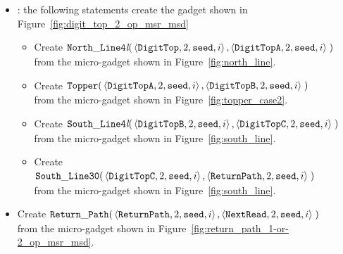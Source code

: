 \begin{itemize}
    \item {\dtop}: the following statements create the gadget shown in Figure~\ref{fig:digit_top_2_op_msr_msd}
        \begin{itemize}
            \item Create
            $\begin{aligned}[t]
                {\tt North\_Line4\textit{l}}(& \left\langle {\tt DigitTop},  2, {\tt seed}, i \right\rangle,
                                               \left\langle {\tt DigitTopA}, 2, {\tt seed}, i \right\rangle\;)
            \end{aligned}$\\ from the micro-gadget shown in Figure~\ref{fig:north_line}.

            \item Create
            $\begin{aligned}[t]
                {\tt Topper}(& \left\langle {\tt DigitTopA}, 2, {\tt seed}, i \right\rangle,
                               \left\langle {\tt DigitTopB}, 2, {\tt seed}, i \right\rangle \;)
            \end{aligned}$\\from the micro-gadget shown in Figure~\ref{fig:topper_case2}.

            \item Create
            $\begin{aligned}[t]
                {\tt South\_Line4\textit{l}}(& \left\langle {\tt DigitTopB}, 2, {\tt seed}, i \right\rangle,
                                               \left\langle {\tt DigitTopC}, 2, {\tt seed}, i \right\rangle \;)
            \end{aligned}$\\from the micro-gadget shown in Figure~\ref{fig:south_line}.

            \item Create
            $\begin{aligned}[t]
                {\tt South\_Line30}(& \left\langle {\tt DigitTopC},  2, {\tt seed}, i \right\rangle,
                                      \left\langle {\tt ReturnPath}, 2, {\tt seed}, i \right\rangle \;)
            \end{aligned}$\\from the micro-gadget shown in Figure~\ref{fig:south_line}.
        \end{itemize}


    \item Create
    $\begin{aligned}[t]
        {\tt Return\_Path}(& \left\langle {\tt ReturnPath}, 2, {\tt seed}, i \right\rangle,
                      \left\langle {\tt NextRead},   2, {\tt seed}, i \right\rangle \;)
    \end{aligned}$\\from the micro-gadget shown in Figure~\ref{fig:return_path_1-or-2_op_msr_msd}.


\end{itemize}
